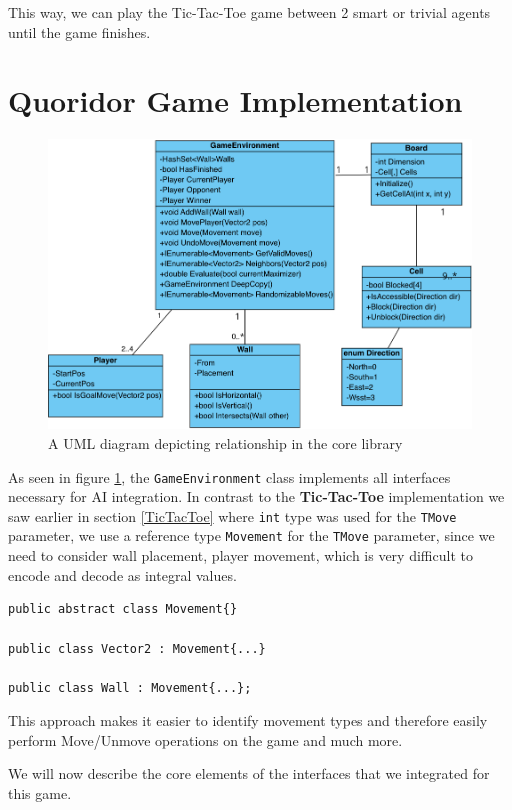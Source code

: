 This way, we can play the Tic-Tac-Toe game between 2 smart or trivial agents until the game finishes.

\section{Quoridor Game Implementation}

\begin{figure}[!ht]
    \centering
    \includegraphics[width=.95\linewidth]{../img/uml_core.png}
    \caption{A UML diagram depicting relationship in the core library}
    \label{fig:core_uml}
\end{figure}

As seen in figure \ref{fig:core_uml}, the \texttt{GameEnvironment} class implements all interfaces necessary for \gls{AI} integration.
In contrast to the \textbf{Tic-Tac-Toe} implementation we saw earlier in section \ref{TicTacToe} where \texttt{int} type was used for the \texttt{TMove} parameter, we use a reference type \texttt{Movement} for the \texttt{TMove} parameter, since we need to consider wall placement, player movement, which is very difficult to encode and decode as integral values.
\begin{lstlisting}
public abstract class Movement{}

public class Vector2 : Movement{...}

public class Wall : Movement{...};
\end{lstlisting}
This approach makes it easier to identify movement types and therefore easily perform Move/Unmove operations on the game and much more.

We will now describe the core elements of the interfaces that we integrated for this game.

